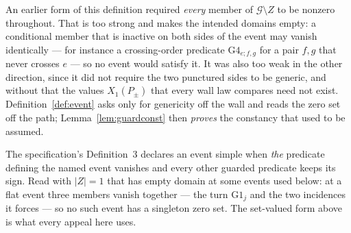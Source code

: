 \begin{remark}\label{rem:zeroset}
An earlier form of this definition required \emph{every} member of
$\mathcal G\setminus Z$ to be nonzero throughout. That is too strong and makes
the intended domains empty: a conditional member that is inactive on both sides
of the event may vanish identically --- for instance a crossing-order predicate
$\mathrm{G4}_{e;f,g}$ for a pair $f,g$ that never crosses $e$ --- so no event
would satisfy it. It was also too weak in the other direction, since it did not
require the two punctured sides to be generic, and without that the values
$X_1(P_\pm)$ that every wall law compares need not exist.
Definition~\ref{def:event} asks only for genericity off the wall and reads the
zero set off the path; Lemma~\ref{lem:guardconst} then \emph{proves} the
constancy that used to be assumed.

The specification's Definition~3 declares an event simple when \emph{the}
predicate defining the named event vanishes and every other guarded predicate
keeps its sign. Read with $|Z|=1$ that has empty domain at some events used
below: at a flat event three members vanish together --- the turn
$\mathrm{G1}_j$ and the two incidences it forces --- so no such event has a
singleton zero set. The set-valued form above is what every appeal here uses.
\end{remark}

